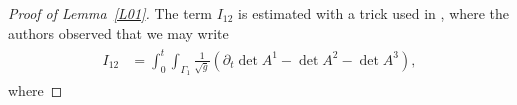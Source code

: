 \documentclass[10pt,reqno]{amsart}
\makeatletter
\theoremstyle{plain}
\theoremstyle{definition}
\numberwithin{equation}{section}
\def\referee#1{{\color{green}\hbox{\bf ~#1~}}} %
\def\paragraph{\@startsection{paragraph}{4}%
  \z@\z@{-\fontdimen2\font}%
  {\normalfont\it}}
\makeatother
\begin{document}
\begin{proof}[Proof of Lemma~\ref{L01}]
The term $I_{12}$ is estimated with a trick used 
in 
\cite[p.~868]{CoutandShkollerFreeBoundary}, where the authors observed that 
we may write
\begin{align}
\begin{split}
I_{12} & = \int_0^t \int_{\Gamma_1}\frac{1}{\sqrt{g}} (\partial_t \det A^1 - \det A^2 - \det A^3 ),
\end{split}
\label{I_12_trick}
\end{align}
where

\end{proof}
\end{document}
